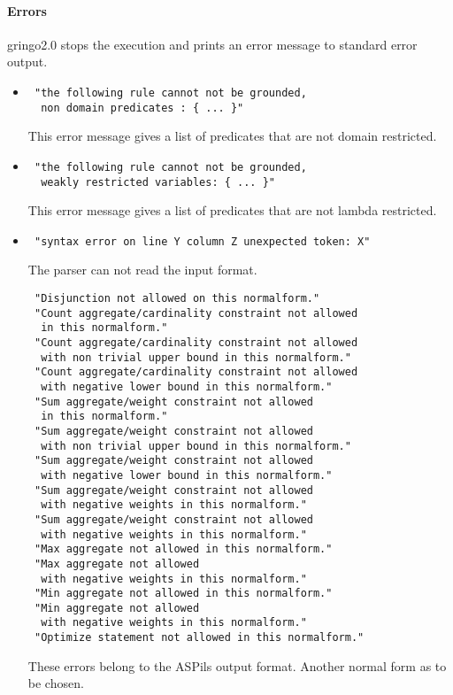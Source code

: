\documentclass[a4paper,10pt]{article}
\begin{document}
\paragraph{Errors}
gringo2.0 stops the execution and prints an error message to standard error output.
\begin{itemize}
 \item 
\begin{verbatim}
 "the following rule cannot not be grounded,
  non domain predicates : { ... }"
\end{verbatim}
This error message gives a list of predicates that are not domain restricted.
 \item 
\begin{verbatim}
 "the following rule cannot not be grounded,
  weakly restricted variables: { ... }"
\end{verbatim}
This error message gives a list of predicates that are not lambda restricted. 
\item
\begin{verbatim}
 "syntax error on line Y column Z unexpected token: X"
\end{verbatim}
The parser can not read the input format.
\begin{verbatim}
 "Disjunction not allowed on this normalform."
 "Count aggregate/cardinality constraint not allowed
  in this normalform."
 "Count aggregate/cardinality constraint not allowed 
  with non trivial upper bound in this normalform."
 "Count aggregate/cardinality constraint not allowed 
  with negative lower bound in this normalform."
 "Sum aggregate/weight constraint not allowed
  in this normalform."
 "Sum aggregate/weight constraint not allowed 
  with non trivial upper bound in this normalform."
 "Sum aggregate/weight constraint not allowed 
  with negative lower bound in this normalform."
 "Sum aggregate/weight constraint not allowed
  with negative weights in this normalform."
 "Sum aggregate/weight constraint not allowed
  with negative weights in this normalform."
 "Max aggregate not allowed in this normalform."
 "Max aggregate not allowed
  with negative weights in this normalform."
 "Min aggregate not allowed in this normalform."
 "Min aggregate not allowed 
  with negative weights in this normalform."
 "Optimize statement not allowed in this normalform."
\end{verbatim}
These errors belong to the ASPils output format. Another normal form as to be chosen.
\end{itemize}
\end{document}
